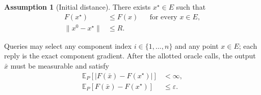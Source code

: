 \documentclass[10pt]{article}
\theoremstyle{definition}
\newtheorem{assumption}{Assumption}
\begin{document}
\begin{assumption}[Initial distance]
There exists $x^\star\in E$ such that
\[
\begin{aligned}
F(x^\star)&\leq F(x) &&\text{for every }x\in E,\\
\|x^0-x^\star\|&\leq R.
\end{aligned}
\]
\end{assumption}

Queries may select any component index $i\in\{1,\ldots,n\}$ and any point $x\in E$; each reply is the exact component gradient. After the allotted oracle calls, the output $\bar{x}$ must be measurable and satisfy
\[
\begin{aligned}
\mathbb{E}_{P}\!\left[\left|F(\bar{x})-F(x^\star)\right|\right]&<\infty,\\
\mathbb{E}_{P}[F(\bar{x})-F(x^\star)]&\leq\varepsilon.
\end{aligned}
\]
\end{document}
